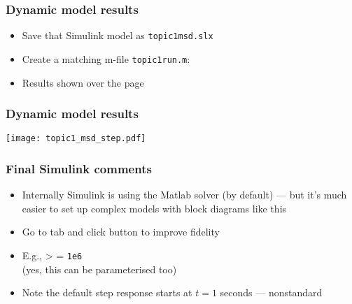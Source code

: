 \documentclass[9pt]{beamer-control}
\begin{document}
\begin{frame}
\frametitle{Dynamic model results}
\begin{itemize}
\item Save that Simulink model as \texttt{topic1msd.slx}
\item Create a matching m-file \texttt{topic1run.m}:
\end{itemize}
\begin{itemize}
\item Results shown over the page
\end{itemize}
\end{frame}

\begin{frame}
\frametitle{Dynamic model results}
\texttt{[image: topic1\_msd\_step.pdf]}
\end{frame}

\begin{frame}
\frametitle{Final Simulink comments}
\begin{itemize}
\item Internally Simulink is using the Matlab  solver (by default) --- but it's much easier to set up complex models with block diagrams like this
\item Go to tab  and click button  to improve fidelity
\item E.g.,  >  = \texttt{1e6}\\
      (yes, this can be parameterised too)
\item Note the default step response starts at $t=1$ seconds --- nonstandard
\end{itemize}
\end{frame}

\SUMMARYFRAME
\end{document}
